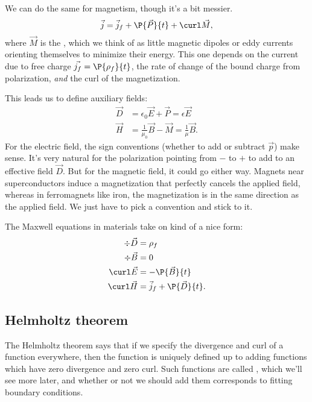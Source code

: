 We can do the same for magnetism, though it's a bit messier.
\begin{equation}
    \vec{j} = \vec{j}_f + \P{\vec{P}}{t}+ \curl \vec{M},
\end{equation}
where $\vec{M}$ is the , which we think of as little magnetic dipoles or eddy currents orienting themselves to minimize their energy. This one depends on the current due to free charge $\vec{j_f} = \P{\rho_f}{t}$, the rate of change of the bound charge from polarization, \emph{and} the curl of the magnetization.

This leads us to define auxiliary fields:
\begin{align}
    \vec D &= \epsilon_0 \vec E + \vec P = \epsilon \vec{E}\\
    \vec H &= \frac{1}{\mu_0} \vec{B} - \vec M  = \frac{1}{\mu} \vec{B}.
\end{align}
For the electric field, the sign conventions (whether to add or subtract $\vec{p}$) make sense. It's very natural for the polarization pointing from $-$ to $+$ to add to an effective field $\vec{D}$. But for the magnetic field, it could go either way. Magnets near superconductors induce a magnetization that perfectly cancels the applied field, whereas in ferromagnets like iron, the magnetization is in the same direction as the applied field. We just have to pick a convention and stick to it.

The Maxwell equations in materials take on kind of a nice form:
\begin{subequations}
\begin{align}
    \div \vec{D} &= \rho_f\\
    \div \vec{B} &= 0\\
    \curl \vec{E} &= -\P{\vec{B}}{t}\\
    \curl \vec{H} &= \vec{j}_f + \P{\vec{D}}{t}.
\end{align}
\end{subequations}

\subsection*{Helmholtz theorem}
The Helmholtz theorem says that if we specify the divergence and curl of a function everywhere, then the function is uniquely defined up to adding functions which have zero divergence and zero curl. Such functions are called , which we'll see more later, and whether or not we should add them corresponds to fitting boundary conditions.

